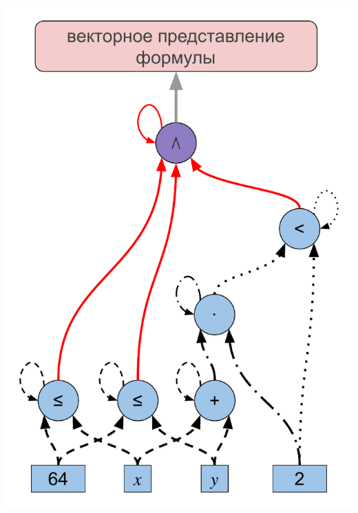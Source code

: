 \documentclass[14pt,aspectratio=169,hyperref={pdftex,unicode},xcolor=dvipsnames]{beamer}
\begin{document}
\begin{frame}[noframenumbering]

\begin{center}
  \includegraphics[scale=0.45]{./assets/formula-ast-talk-4.pdf}
\end{center}

\end{frame}
\end{document}
